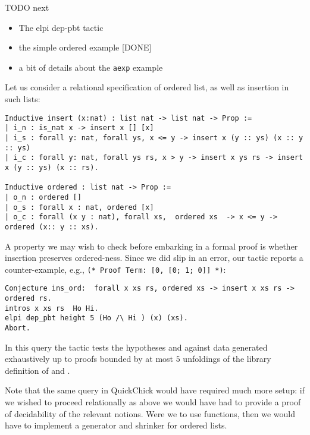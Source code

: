 \begin{metanote}
  TODO next
  \begin{itemize}
  \item The elpi dep-pbt tactic
  \item  the simple ordered example [DONE]
  \item a bit of details about the \texttt{aexp} example
  \end{itemize}
\end{metanote} 

Let us consider a  relational specification of ordered list, as well as insertion in such lists:
\begin{lstlisting}
Inductive insert (x:nat) : list nat -> list nat -> Prop :=
| i_n : is_nat x -> insert x [] [x]
| i_s : forall y: nat, forall ys, x <= y -> insert x (y :: ys) (x :: y :: ys)
| i_c : forall y: nat, forall ys rs, x > y -> insert x ys rs -> insert x (y :: ys) (x :: rs).

Inductive ordered : list nat -> Prop :=
| o_n : ordered []
| o_s : forall x : nat, ordered [x]
| o_c : forall (x y : nat), forall xs,  ordered xs  -> x <= y -> ordered (x:: y :: xs).     
\end{lstlisting}
%
A property we may wish to check before embarking in a formal proof is whether insertion preserves ordered-ness. Since we did slip in an error, our tactic reports a counter-example, e.g.,
\verb|(* Proof Term: [0, [0; 1; 0]] *)|:
\begin{lstlisting}
Conjecture ins_ord:  forall x xs rs, ordered xs -> insert x xs rs -> ordered rs.
intros x xs rs  Ho Hi.
elpi dep_pbt height 5 (Ho /\ Hi ) (x) (xs).
Abort.
\end{lstlisting}
In this query the tactic tests the hypotheses  and 
against data  generated exhaustively up to proofs bounded by
at most $5$ unfoldings of the library  definition of
 and .

Note that the same query in \textsf{QuickChick} would have required much more setup: if we wished to proceed relationally as above we would have had to provide a proof of decidability of the relevant notions. Were we to use functions, then we would have to implement a generator and shrinker for ordered lists.

